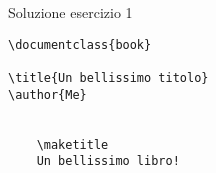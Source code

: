 \begin{frame}[fragile]{Soluzione esercizio 1}

\begin{lstlisting}
\documentclass{book}

\title{Un bellissimo titolo}
\author{Me}


	\maketitle
	Un bellissimo libro!

\end{lstlisting}

\end{frame}